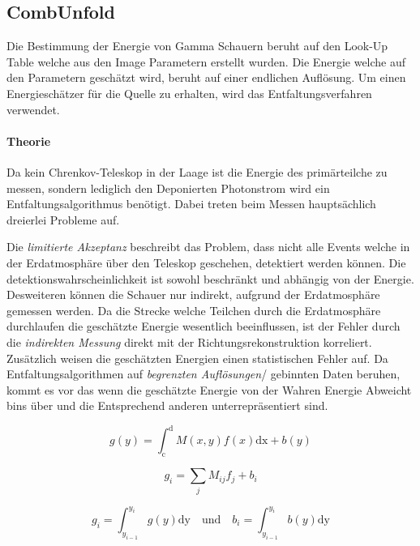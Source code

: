 \subsection{CombUnfold}%
\label{sub:combunfold}
Die Bestimmung der Energie von Gamma Schauern beruht auf den Look-Up Table
welche aus den Image Parametern erstellt wurden. 
Die Energie welche auf den Parametern geschätzt wird, beruht auf einer 
endlichen Auflösung.
Um einen Energieschätzer für die Quelle zu erhalten, 
wird das Entfaltungsverfahren verwendet.

\paragraph{Theorie}%
\label{par:theorie}
Da kein Chrenkov-Teleskop in der Laage ist die Energie 
des primärteilche zu messen,
sondern lediglich den Deponierten Photonstrom wird ein Entfaltungsalgorithmus
benötigt.
Dabei treten beim Messen hauptsächlich dreierlei Probleme auf.

Die \textit{limitierte Akzeptanz} beschreibt das Problem, 
dass nicht alle Events welche in der Erdatmosphäre über den Teleskop geschehen,
detektiert werden können. 
Die detektionswahrscheinlichkeit ist sowohl beschränkt 
und abhängig von der Energie.
Desweiteren können die Schauer nur indirekt, 
aufgrund der Erdatmosphäre gemessen werden.
Da die Strecke welche Teilchen durch die Erdatmosphäre durchlaufen die
geschätzte Energie wesentlich beeinflussen,
ist der Fehler durch die \textit{indirekten Messung} direkt mit der
Richtungsrekonstruktion korreliert.
Zusätzlich weisen die geschätzten Energien einen statistischen Fehler auf. 
Da Entfaltungsalgorithmen auf \textit{begrenzten Auflösungen}/ gebinnten Daten
beruhen, kommt es vor das wenn die geschätzte Energie von der Wahren Energie
Abweicht bins über und die Entsprechend anderen unterrepräsentiert sind.

\begin{equation}
	g(y) = \int_\text{c}^\text{d} M(x,y) f(x) \text{dx} + b(y)
\end{equation}

\begin{equation}
	g_i = \sum_j M_{ij} f_j + b_i
\end{equation}

\begin{equation}
	g_i = \int_{y_{i-1}}^{y_i} g(y) \text{dy} \quad \text{und} \quad
	b_i = \int_{y_{i-1}}^{y_i} b(y) \text{dy}
\end{equation}

